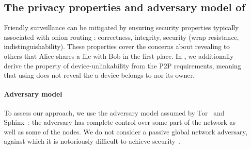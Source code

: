 \subsection{The privacy properties and adversary model of \name}

Friendly surveillance can be mitigated by ensuring security properties 
typically associated with onion routing \cite{CLOnionRouting}: 
correctness, integrity, security (wrap resistance,
indistinguishability). These properties cover the concerns about
revealing to others that Alice shares a file with Bob in the first
place. In \name, we additionally derive the property of
device-unlinkability from the \ac{P2P} requirements, meaning that
using \name does not reveal the \squad a device belongs to nor its
owner.  

\paragraph*{Adversary model} To assess our approach, we use the adversary model assumed by Tor~\cite{Tor} and
Sphinx~\cite{Sphinx}: the adversary has complete control over some part of
the network as well as some of the nodes. We do not consider a passive
global network adversary, against which it is notoriously difficult to
achieve security~\cite{SystemsForAnonymousCommunication}.
